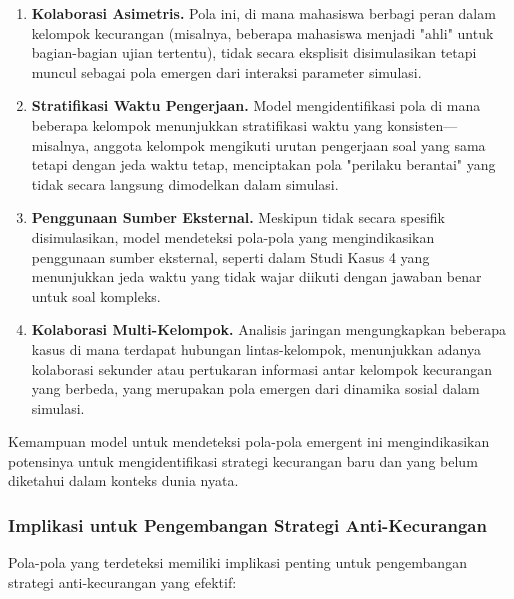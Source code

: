 \begin{enumerate}
    \item \textbf{Kolaborasi Asimetris.} Pola ini, di mana mahasiswa berbagi peran dalam kelompok kecurangan (misalnya, beberapa mahasiswa menjadi "ahli" untuk bagian-bagian ujian tertentu), tidak secara eksplisit disimulasikan tetapi muncul sebagai pola emergen dari interaksi parameter simulasi.
    
    \item \textbf{Stratifikasi Waktu Pengerjaan.} Model mengidentifikasi pola di mana beberapa kelompok menunjukkan stratifikasi waktu yang konsisten—misalnya, anggota kelompok mengikuti urutan pengerjaan soal yang sama tetapi dengan jeda waktu tetap, menciptakan pola "perilaku berantai" yang tidak secara langsung dimodelkan dalam simulasi.
    
    \item \textbf{Penggunaan Sumber Eksternal.} Meskipun tidak secara spesifik disimulasikan, model mendeteksi pola-pola yang mengindikasikan penggunaan sumber eksternal, seperti dalam Studi Kasus 4 yang menunjukkan jeda waktu yang tidak wajar diikuti dengan jawaban benar untuk soal kompleks.
    
    \item \textbf{Kolaborasi Multi-Kelompok.} Analisis jaringan mengungkapkan beberapa kasus di mana terdapat hubungan lintas-kelompok, menunjukkan adanya kolaborasi sekunder atau pertukaran informasi antar kelompok kecurangan yang berbeda, yang merupakan pola emergen dari dinamika sosial dalam simulasi.
\end{enumerate}

Kemampuan model untuk mendeteksi pola-pola emergent ini mengindikasikan potensinya untuk mengidentifikasi strategi kecurangan baru dan yang belum diketahui dalam konteks dunia nyata.

\subsubsection{Implikasi untuk Pengembangan Strategi Anti-Kecurangan}

Pola-pola yang terdeteksi memiliki implikasi penting untuk pengembangan strategi anti-kecurangan yang efektif:

